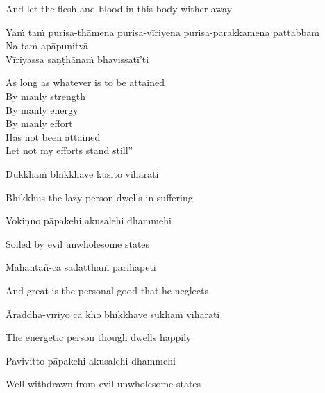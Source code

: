 \begin{english}
  And let the flesh and blood in this body wither away
\end{english}

Yaṁ taṁ purisa-thāmena purisa-vīriyena purisa-parakkamena pattabbaṁ\\
Na taṁ apāpuṇitvā\\
Vīriyassa saṇṭhānaṁ bhavissatī’ti

\begin{english}
  As long as whatever is to be attained\\
  By manly strength\\
  By manly energy\\
  By manly effort\\
  Has not been attained\\
  Let not my efforts stand still”
\end{english}

Dukkhaṁ bhikkhave kusīto viharati

\begin{english}
  Bhikkhus the lazy person dwells in suffering
\end{english}

Vokiṇṇo pāpakehi akusalehi dhammehi

\begin{english}
  Soiled by evil unwholesome states
\end{english}

Mahantañ-ca sadatthaṁ parihāpeti

\begin{english}
  And great is the personal good that he neglects
\end{english}

Āraddha-vīriyo ca kho bhikkhave sukhaṁ viharati

\begin{english}
  The energetic person though dwells happily
\end{english}

Pavivitto pāpakehi akusalehi dhammehi

\begin{english}
  Well withdrawn from evil
  unwholesome states
\end{english}

